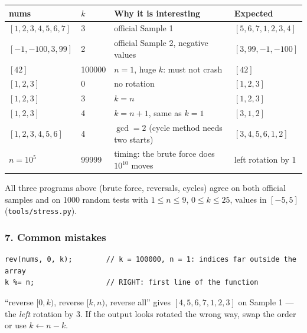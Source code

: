 \begin{testbox}
\centering\small
\begin{tabular}{@{}llll@{}}
\toprule
\textbf{nums} & $k$ & \textbf{Why it is interesting} & \textbf{Expected} \\
\midrule
$[1,2,3,4,5,6,7]$ & 3 & official Sample 1 & $[5,6,7,1,2,3,4]$ \\
$[-1,-100,3,99]$ & 2 & official Sample 2, negative values & $[3,99,-1,-100]$ \\
$[42]$ & 100000 & $n = 1$, huge $k$: must not crash & $[42]$ \\
$[1,2,3]$ & 0 & no rotation & $[1,2,3]$ \\
$[1,2,3]$ & 3 & $k = n$ & $[1,2,3]$ \\
$[1,2,3]$ & 4 & $k = n+1$, same as $k = 1$ & $[3,1,2]$ \\
$[1,2,3,4,5,6]$ & 4 & $\gcd = 2$ (cycle method needs two starts) & $[3,4,5,6,1,2]$ \\
$n = 10^5$ & 99999 & timing: the brute force does $10^{10}$ moves & left rotation by 1 \\
\bottomrule
\end{tabular}

\medskip
All three programs above (brute force, reversals, cycles) agree on both official samples and on 1000 random tests with $1 \le n \le 9$, $0 \le k \le 25$, values in $[-5,5]$ (\texttt{tools/stress.py}).
\end{testbox}

\subsubsection*{7. Common mistakes}

\begin{warningbox}
\begin{lstlisting}[style=snippet]
rev(nums, 0, k);        // k = 100000, n = 1: indices far outside the array
k %= n;                 // RIGHT: first line of the function
\end{lstlisting}
\end{warningbox}

\begin{warningbox}
``reverse $[0,k)$, reverse $[k,n)$, reverse all'' gives $[4,5,6,7,1,2,3]$ on Sample 1 --- the \emph{left} rotation by 3. If the output looks rotated the wrong way, swap the order or use $k \leftarrow n - k$.
\end{warningbox}

